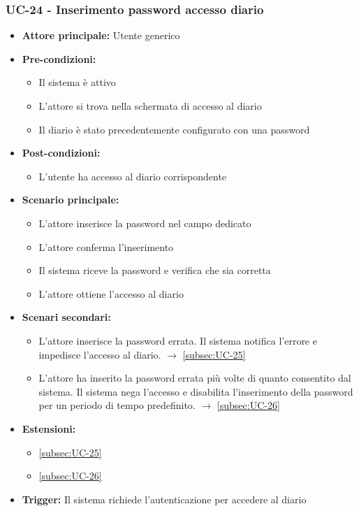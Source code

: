 \documentclass[a4paper,12pt]{article}
\begin{document}
\subsubsection{UC-24 - Inserimento password accesso diario} \label{subsec:UC-24}
\begin{itemize}
    \item \textbf{Attore principale:} Utente generico
    \item \textbf{Pre-condizioni:}
    \begin{itemize}
        \item Il sistema è attivo
        \item L'attore si trova nella schermata di accesso al diario
        \item Il diario è stato precedentemente configurato con una password
    \end{itemize}
    \item \textbf{Post-condizioni:} 
    \begin{itemize}
        \item L'utente ha accesso al diario corrispondente
    \end{itemize}
    \item \textbf{Scenario principale:} 
    \begin{itemize}
        \item L'attore inserisce la password nel campo dedicato
        \item L'attore conferma l'inserimento
        \item Il sistema riceve la password e verifica che sia corretta
        \item L'attore ottiene l'accesso al diario
    \end{itemize}
    \item \textbf{Scenari secondari:} 
    \begin{itemize}
        \item L'attore inserisce la password errata. Il sistema notifica l'errore e impedisce l'accesso al diario. $\rightarrow$ \ref{subsec:UC-25}
        \item L'attore ha inserito la password errata più volte di quanto consentito dal sistema. Il sistema nega l'accesso e disabilita l'inserimento della password per un periodo di tempo predefinito. $\rightarrow$ \ref{subsec:UC-26}
    \end{itemize}
    \item \textbf{Estensioni:}
    \begin{itemize}
        \item \ref{subsec:UC-25}
        \item \ref{subsec:UC-26}
    \end{itemize}
    \item \textbf{Trigger:} Il sistema richiede l'autenticazione per accedere al diario
\end{itemize}
\end{document}
